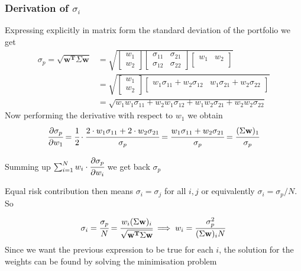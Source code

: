 \begin{attention}
\subsubsection{Derivation of $\sigma_i$}
Expressing explicitly in matrix form the standard deviation of the portfolio we get
\[
\begin{split}
\sigma_p={\sqrt {\mathbf{w^T}\Sigma \mathbf{w}}} & =
\sqrt{
	\begin{bmatrix}
	w_{1} \\
	w_{2}
	\end{bmatrix}
	\begin{bmatrix}
	\sigma_{11} & \sigma_{21} \\
	\sigma_{12} & \sigma_{22} 
	\end{bmatrix}
	\begin{bmatrix}
	w_{1} & w_{2} \\
	\end{bmatrix}
}\\
&=
\sqrt{
	\begin{bmatrix}
	w_{1} \\
	w_{2}
	\end{bmatrix}
	\begin{bmatrix}
w_{1}\sigma_{11} + w_{2}\sigma_{12} & w_{1}\sigma_{21} + w_{2}\sigma_{22} \\
	\end{bmatrix}
} \\
&= \sqrt{
w_{1}w_{1}\sigma_{11} + w_{2}w_{1}\sigma_{12} + w_{1}w_{2}\sigma_{21} + w_{2}w_{2}\sigma_{22} }
\end{split}
\]
Now performing the derivative with respect to $w_1$ we obtain
\[\cfrac{\partial\sigma_p}{\partial w_1} = \cfrac{1}{2}\cdot\cfrac{2\cdot w_1\sigma_{11} + 2\cdot w_{2}\sigma_{21}}{\sigma_p} = \cfrac{w_1\sigma_{11} + w_{2}\sigma_{21}}{\sigma_p} = \cfrac{(\Sigma \mathbf{w})_{1}}{\sigma_p}\]
	
Summing up $\sum_{i=1}^{N} w_i\cdot\cfrac{\partial\sigma_p}{\partial w_i}$ we get back $\sigma_p$
\end{attention}

Equal risk contribution then means \(\sigma _{i} =\sigma _{j}\) for all \(i,j\) or equivalently \(\sigma _{i}=\sigma_p/N\). So

\begin{equation}
\sigma _{i} = \cfrac{\sigma_p}{N}={\cfrac {w_{i}(\Sigma \mathbf{w})_{i}}{\sqrt {\mathbf{w^T}\Sigma \mathbf{w}}}}\implies w_{i} = \frac {\sigma_p^{2}}{(\Sigma \mathbf{w})_{i}N}
\label{eq:risk_parity_weights}
\end{equation}
Since we want the previous expression to be true for each $i$, the solution for the weights can be found by solving the minimisation problem

